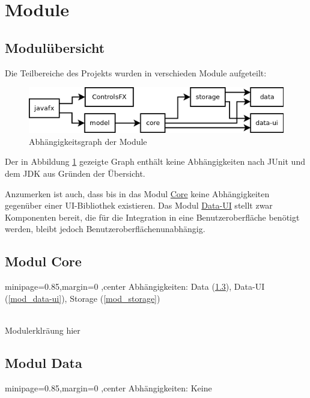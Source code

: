 
\newcommand{\depBox}[1]{
	\begin{adjustbox}{minipage=0.85\textwidth,margin=0 \smallskipamount,center}
		Abhängigkeiten:	 \quad #1
	\end{adjustbox} ~\\
}
\newcommand{\refModCore}{\hyperref[mod_core]{Core}}
\newcommand{\refModData}{\hyperref[mod_data]{Data}}
\newcommand{\refModDataUI}{\hyperref[mod_data-ui]{Data-UI}}
\newcommand{\refModJavaFX}{\hyperref[mod_javafx]{JavaFX}}
\newcommand{\refModModel}{\hyperref[mod_model]{Model}}
\newcommand{\refModStorage}{\hyperref[mod_storage]{Storage}}

\section{Module}
\subsection{Modulübersicht}
Die Teilbereiche des Projekts wurden in verschieden Module aufgeteilt:
\begin{figure}[hb!]
	\centering
	\includegraphics[width=.8\textwidth]{module_dependencies.png}
	\caption{Abhängigkeitsgraph der Module}
	\label{mod_dep_view}
\end{figure}

Der in Abbildung \ref{mod_dep_view} gezeigte Graph enthält keine Abhängigkeiten nach JUnit und
dem JDK aus Gründen der Übersicht.

Anzumerken ist auch, dass bis in das Modul \refModCore{} keine Abhängigkeiten
gegenüber einer UI-Bibliothek existieren. Das Modul \hyperref[mod_data-ui]{Data-UI} stellt
zwar Komponenten bereit, die für die Integration in eine Benutzeroberfläche benötigt werden,
bleibt jedoch Benutzeroberflächenunabhängig.


\subsection{Modul Core}
\label{mod_core}
\depBox{Data (\ref{mod_data}), Data-UI (\ref{mod_data-ui}), Storage (\ref{mod_storage})}

Modulerklräung hier




\subsection{Modul Data}
\label{mod_data}
\depBox{Keine}

